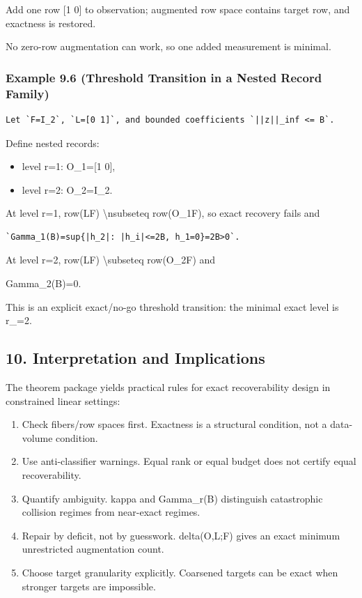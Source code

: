 \documentclass[11pt]{article}
\begin{document}
Add one row [1 0] to observation; augmented row space contains target row, and exactness is restored.

No zero-row augmentation can work, so one added measurement is minimal.


\subsubsection*{Example 9.6 (Threshold Transition in a Nested Record Family)}
\begin{verbatim}
Let `F=I_2`, `L=[0 1]`, and bounded coefficients `||z||_inf <= B`.
\end{verbatim}
Define nested records:

\begin{itemize}
\item level r=1: O\_1=[1 0],
\item level r=2: O\_2=I\_2.
\end{itemize}

At level r=1, row(LF) \textbackslash{}nsubseteq row(O\_1F), so exact recovery fails and

\begin{verbatim}
`Gamma_1(B)=sup{|h_2|: |h_i|<=2B, h_1=0}=2B>0`.
\end{verbatim}

At level r=2, row(LF) \textbackslash{}subseteq row(O\_2F) and

Gamma\_2(B)=0.


This is an explicit exact/no-go threshold transition: the minimal exact level is r\_=2.


\subsection*{10. Interpretation and Implications}
The theorem package yields practical rules for exact recoverability design in constrained linear settings:

\begin{enumerate}
\item Check fibers/row spaces first. Exactness is a structural condition, not a data-volume condition.
\item Use anti-classifier warnings. Equal rank or equal budget does not certify equal recoverability.
\item Quantify ambiguity. kappa and Gamma\_r(B) distinguish catastrophic collision regimes from near-exact regimes.
\item Repair by deficit, not by guesswork. delta(O,L;F) gives an exact minimum unrestricted augmentation count.
\item Choose target granularity explicitly. Coarsened targets can be exact when stronger targets are impossible.
\end{enumerate}
\end{document}
